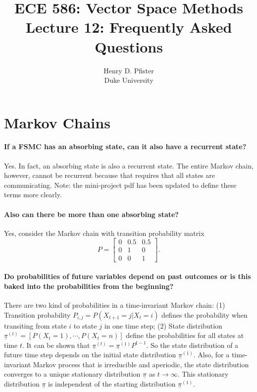\documentclass[10pt,english]{article}
\begin{document}
\title{ECE 586: Vector Space Methods \\ Lecture 12: Frequently Asked Questions}
\author{Henry D. Pfister \\ Duke University}

\maketitle

\section{Markov Chains}

\paragraph{If a FSMC has an absorbing state, can it also have a recurrent state?}

Yes.  In fact, an absorbing state is also a recurrent state.  The entire Markov chain, however, cannot be recurrent because that requires that all states are communicating.  Note: the mini-project pdf has been updated to define these terms more clearly.

\paragraph{Also can there be more than one absorbing state?} Yes, consider the Markov chain with transition probability matrix
$$P=\begin{bmatrix} 0 & 0.5 & 0.5 \\ 0 & 1 & 0 \\ 0 & 0 & 1 \end{bmatrix}.$$

\paragraph{Do probabilities of future variables depend on past outcomes or is this baked into the probabilities from the beginning?}

There are two kind of probabilities in a time-invariant Markov chain: (1) Transition probability $P_{i,j} =P(X_{t+1}=j|X_{t}=i)$ defines the probability when transiting from state $i$ to state $j$ in one time step; (2) State distribution $\underline{\pi}^{(t)}=[P(X_t=1), \cdots, P(X_t=n)]$ define the probabilities for all states at time $t$. It can be shown that $\underline{\pi}^{(t)}=\underline{\pi}^{(1)}P^{t-1}$. So the state distribution of a future time step depends on the initial state distribution $\underline{\pi}^{(1)}$. Also, for a time-invariant Markov process that is irreducible and aperiodic, the state distribution converges to a unique stationary distribution $\underline{\pi}$ as $t \rightarrow \infty$. This stationary distribution $\underline{\pi}$ is independent of the starting distribution $\underline{\pi}^{(1)}$.
\end{document}
